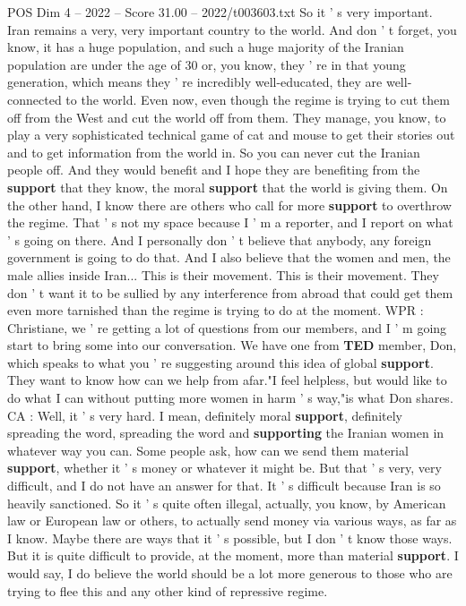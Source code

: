 \begin{textsample}{POS Dim 4 – 2022 – Score 31.00 – 2022/t003603.txt}
So it ' s very important.
Iran remains a very, very important country to the world.
And don ' t forget, you know, it has a huge population, and such a huge majority of the Iranian population are under the age of 30 or, you know, they ' re in that young generation, which means they ' re incredibly well-educated, they are well-connected to the world.
Even now, even though the regime is trying to cut them off from the West and cut the world off from them.
They manage, you know, to play a very sophisticated technical game of cat and mouse to get their stories out and to get information from the world in.
So you can never cut the Iranian people off.
And they would benefit and I hope they are benefiting from the \textbf{support} that they know, the moral \textbf{support} that the world is giving them.
On the other hand, I know there are others who call for more \textbf{support} to overthrow the regime.
That ' s not my space because I ' m a reporter, and I report on what ' s going on there.
And I personally don ' t believe that anybody, any foreign government is going to do that.
And I also believe that the women and men, the male allies inside Iran...
This is their movement.
This is their movement.
They don ' t want it to be sullied by any interference from abroad that could get them even more tarnished than the regime is trying to do at the moment.
WPR : Christiane, we ' re getting a lot of questions from our members, and I ' m going start to bring some into our conversation.
We have one from \textbf{TED} member, Don, which speaks to what you ' re suggesting around this idea of global \textbf{support}.
They want to know how can we help from afar."I feel helpless, but would like to do what I can without putting more women in harm ' s way,"is what Don shares.
CA : Well, it ' s very hard.
I mean, definitely moral \textbf{support}, definitely spreading the word, spreading the word and \textbf{supporting} the Iranian women in whatever way you can.
Some people ask, how can we send them material \textbf{support}, whether it ' s money or whatever it might be.
But that ' s very, very difficult, and I do not have an answer for that.
It ' s difficult because Iran is so heavily sanctioned.
So it ' s quite often illegal, actually, you know, by American law or European law or others, to actually send money via various ways, as far as I know.
Maybe there are ways that it ' s possible, but I don ' t know those ways.
But it is quite difficult to provide, at the moment, more than material \textbf{support}.
I would say, I do believe the world should be a lot more generous to those who are trying to flee this and any other kind of repressive regime.

\end{textsample}
